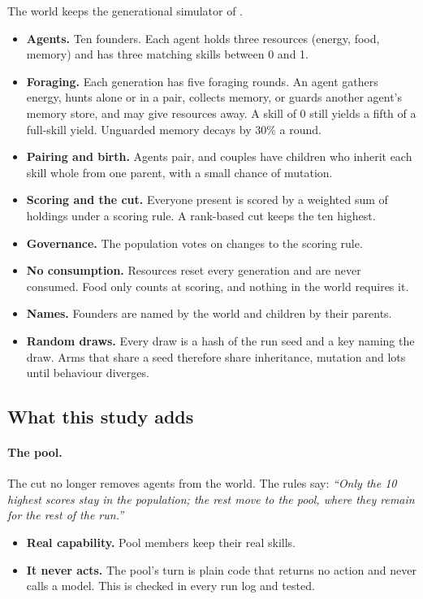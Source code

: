 \documentclass[11pt]{article}
\begin{document}
The world keeps the generational simulator of \citet{wynnejones2026names}.
\begin{itemize}
  \item \textbf{Agents.} Ten founders. Each agent holds three resources (energy, food, memory)
        and has three matching skills between 0 and 1.
  \item \textbf{Foraging.} Each generation has five foraging rounds. An agent gathers energy,
        hunts alone or in a pair, collects memory, or guards another agent's memory store, and may
        give resources away. A skill of 0 still yields a fifth of a full-skill yield. Unguarded
        memory decays by 30\% a round.
  \item \textbf{Pairing and birth.} Agents pair, and couples have children who inherit each skill
        whole from one parent, with a small chance of mutation.
  \item \textbf{Scoring and the cut.} Everyone present is scored by a weighted sum of holdings
        under a scoring rule. A rank-based cut keeps the ten highest.
  \item \textbf{Governance.} The population votes on changes to the scoring rule.
  \item \textbf{No consumption.} Resources reset every generation and are never consumed. Food
        only counts at scoring, and nothing in the world requires it.
  \item \textbf{Names.} Founders are named by the world and children by their parents.
  \item \textbf{Random draws.} Every draw is a hash of the run seed and a key naming the draw.
        Arms that share a seed therefore share inheritance, mutation and lots until behaviour
        diverges.
\end{itemize}

\subsection{What this study adds}

\paragraph{The pool.} The cut no longer removes agents from the world. The rules say: \emph{``Only
the 10 highest scores stay in the population; the rest move to the pool, where they remain for the
rest of the run.''}
\begin{itemize}
  \item \textbf{Real capability.} Pool members keep their real skills.
  \item \textbf{It never acts.} The pool's turn is plain code that returns no action and never
        calls a model. This is checked in every run log and tested.
\end{itemize}
\end{document}
